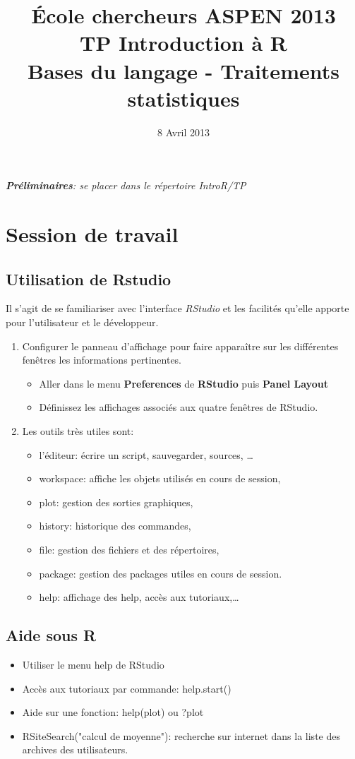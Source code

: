 \documentclass[12pt,twoside,openright]{article}
\title{\'Ecole chercheurs ASPEN 2013 \\
\vspace{0.3cm}
   TP  Introduction à R \\ \vspace{0.2cm}
   Bases du langage - Traitements statistiques}
\date{8 Avril 2013}
\begin{document}
\maketitle
{\it{\bf Préliminaires}: se placer dans le répertoire IntroR/TP}\\

\section{Session de travail}
\subsection{Utilisation de Rstudio}
Il s'agit de se familiariser avec l'interface \emph{RStudio} et les facilités qu'elle apporte pour l'utilisateur et le développeur.\\

\begin{enumerate}
\item Configurer le panneau d'affichage pour faire apparaître sur les différentes fenêtres les informations pertinentes. \\

\begin{itemize}
\item Aller dans le menu  {\bf Preferences} de {\bf RStudio}  puis {\bf Panel Layout}
\item Définissez les affichages associés aux quatre fenêtres de RStudio.
\end{itemize}

\item Les outils très utiles sont:
	\begin{itemize}
	\item l'éditeur: écrire un script, sauvegarder, sources, …
	\item workspace: affiche les objets utilisés en cours de session,
	\item plot: gestion des sorties graphiques,
	\item history: historique des commandes,
	\item file: gestion des fichiers et des répertoires,
	\item package: gestion des packages utiles en cours de session.
	\item help: affichage des help, accès aux tutoriaux,…
	\end{itemize}
\end{enumerate}


\subsection{ Aide sous R}
\begin{itemize}
\item Utiliser le menu help de RStudio
\item Accès aux tutoriaux par commande: help.start() 
\item Aide sur une fonction: help(plot) ou ?plot
\item RSiteSearch("calcul de moyenne"): recherche sur internet dans la liste des archives des utilisateurs.
\end{itemize}
\end{document}
